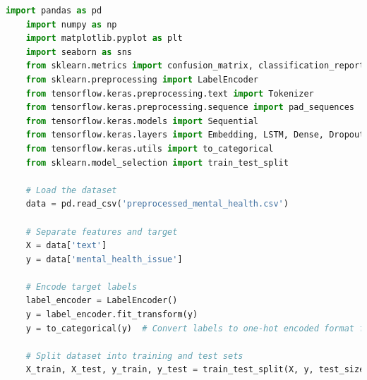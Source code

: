 \begin{tcolorbox}[colback=gray!5!white, colframe=gray!80!black, boxrule=0.5pt, title=LSTM Model Implementation]
    \begin{lstlisting}[language=Python]
    import pandas as pd
    import numpy as np
    import matplotlib.pyplot as plt
    import seaborn as sns
    from sklearn.metrics import confusion_matrix, classification_report
    from sklearn.preprocessing import LabelEncoder
    from tensorflow.keras.preprocessing.text import Tokenizer
    from tensorflow.keras.preprocessing.sequence import pad_sequences
    from tensorflow.keras.models import Sequential
    from tensorflow.keras.layers import Embedding, LSTM, Dense, Dropout
    from tensorflow.keras.utils import to_categorical
    from sklearn.model_selection import train_test_split

    # Load the dataset
    data = pd.read_csv('preprocessed_mental_health.csv')

    # Separate features and target
    X = data['text']
    y = data['mental_health_issue']

    # Encode target labels
    label_encoder = LabelEncoder()
    y = label_encoder.fit_transform(y)
    y = to_categorical(y)  # Convert labels to one-hot encoded format for multi-class classification

    # Split dataset into training and test sets
    X_train, X_test, y_train, y_test = train_test_split(X, y, test_size=0.2, random_state=42)
\end{lstlisting}
\end{tcolorbox}

